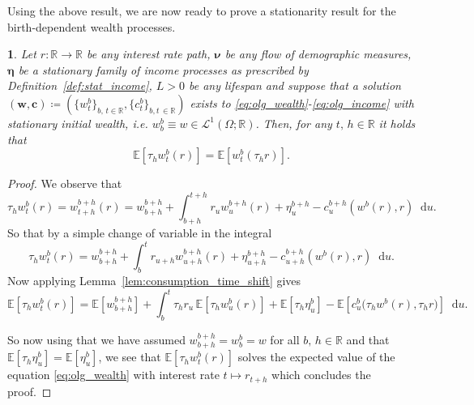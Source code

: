 \documentclass[11pt,oneside,english,reqno,dvipsnames,table]{amsart}
\numberwithin{equation}{section}
\theoremstyle{plain}
\theoremstyle{definition}
\theoremstyle{remark}
\theoremstyle{plain}
\theoremstyle{plain}
\newtheorem{prop}[thm]{\protect\propositionname}
\theoremstyle{plain}
\theoremstyle{plain}
\theoremstyle{plain}
\theoremstyle{plain}
\theoremstyle{plain}
\providecommand{\propositionname}{Proposition}
\newcommand{\EE}{\mathbb{E}}
\newcommand{\bc}{\mathbf{c}}
\newcommand{\bw}{\mathbf{w}}
\newcommand{\dd}{\mathop{}\!\mathrm{d}}
\newcommand{\mbR}{\mathbb{R}}
\newcommand{\msL}{\mathscr{L}}
\newcommand{\bmeta}{\boldsymbol{\eta}}
\newcommand{\bnu}{\boldsymbol{\nu}}
\numberwithin{thm}{section}
\begin{document}
Using the above result, we are now ready to prove  a stationarity result for the birth-dependent wealth processes. 

\begin{prop}\label{prop:wealth_time_shift}
    Let $r:\mbR\to \mbR$ be any interest rate path, $\bnu$ be any flow of demographic measures, $\bmeta$ be a stationary family of income processes as prescribed by Definition~\ref{def:stat_income}, $L>0$ be any lifespan and suppose that a solution $(\bw,\bc) \coloneqq (\{w^b_t\}_{b,\,t\in \mbR},\{c^b_t\}_{b,t\, \in \mbR})$ exists to \eqref{eq:olg_wealth}-\eqref{eq:olg_income} with stationary initial wealth, i.e. $w^b_b \equiv w \in\msL^1(\Omega;\mbR)$. Then, for any $t,\, h\in \mbR$ it holds that
    \begin{equation*}
    	 \EE[\tau_h w_t^b(r)] = \EE[w_t^b( \tau_h r)].
    \end{equation*}
\end{prop}
%
\begin{proof}
We observe that 
%
\begin{equation*}
\tau_h w_t^b(r)= w_{t+h}^{b+h}(r)=w^{b+h}_{b+h}+\int_{b+h}^{t+h}r_u w_u^{b+h}(r)+\eta_u^{b+h}-c_u^{b+h}(w^b(r),r)\dd u.
\end{equation*}
So that by a simple change of variable in the integral
%
\begin{equation*}
\tau_h w_t^b(r)=w^{b+h}_{b+h}+\int_{b}^{t}r_{u+h} w_{u+h}^{b+h}(r)+\eta_{u+h}^{b+h}-c_{u+h}^{b+h}(w^b(r),r)\dd u. 
\end{equation*}
Now applying Lemma~\ref{lem:consumption_time_shift}  gives
%
\begin{equation*}
\EE[\tau_h w_t^b(r)]=\EE[w^{b+h}_{b+h}]+\int_{b}^{t}\tau_h r_{u} \,\EE[\tau_h w_{u}^b(r)]+\EE[\tau_h \eta_{u}^b]-\EE[c_{u}^b\big(\tau_h w^b(r),\tau_h r\big)]\dd u. 
\end{equation*}
%
   
So now using that we have assumed $w^{b+h}_{b+h}=w^b_b = w$ for all $b,\, h\in \mbR$ and that $\EE[\tau_h \eta_{u}^b]=\EE[ \eta_{u}^b]$, we see that $\EE[\tau_h w_t^b(r)]$ solves the expected value of the equation \eqref{eq:olg_wealth} with interest rate  $t\mapsto r_{t+h}$  which concludes the proof. 
\end{proof}
\end{document}
